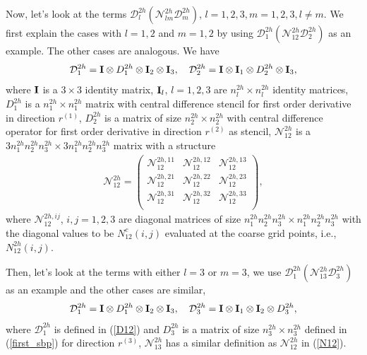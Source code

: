 Now, let's look at the terms $\mathcal{D}_l^{2h}(\mathcal{N}_{lm}^{2h}\mathcal{D}_m^{2h})$, $l = 1,2,3, m = 1,2,3, l\neq m$. We first explain the cases with $l = 1,2$ and $m = 1,2$ by using $\mathcal{D}_1^{2h}(\mathcal{N}_{12}^{2h}\mathcal{D}_2^{2h})$ as an example. The other cases are analogous. We have 
\begin{equation}\label{D12}
\mathcal{D}_1^{2h} = {\bf I}\otimes D_1^{2h} \otimes {\bf I}_2 \otimes {\bf I}_3,\ \ \ \mathcal{D}_2^{2h} ={\bf I}\otimes {\bf I}_1\otimes D_2^{2h}\otimes {\bf I}_3,
\end{equation}
where ${\bf I}$ is a $3\times3$ identity matrix, ${\bf I}_l$, $l = 1,2,3$ are $n_l^{2h}\times n_l^{2h}$ identity matrices, $D_1^{2h}$ is a $n_1^{2h}\times n_1^{2h}$ matrix with central difference stencil for first order derivative in direction $r^{(1)}$, $D_2^{2h}$ is a matrix of size $n_2^{2h}\times n_2^{2h}$ with central difference operator for first order derivative in direction $r^{(2)}$ as stencil, $\mathcal{N}_{12}^{2h}$ is a $3n_1^{2h}n_2^{2h}n_3^{2h}\times3n_1^{2h}n_2^{2h}n_3^{2h}$ matrix with a structure
\begin{align}\label{N12}
\mathcal{N}_{12}^{2h}= \left(\begin{array}{ccc}
\mathscr{N}_{12}^{2h,11}&\mathscr{N}_{12}^{2h,12}& \mathscr{N}_{12}^{2h,13}\\
\mathscr{N}_{12}^{2h,21} & \mathscr{N}_{12}^{2h,22} & \mathscr{N}_{12}^{2h,23} \\
\mathscr{N}_{12}^{2h,31}&\mathscr{N}_{12}^{2h,32}&  \mathscr{N}_{12}^{2h,33}\\ \end{array}\right),
\end{align}
where $\mathscr{N}_{12}^{2h,ij}$, $i,j = 1,2,3$ are diagonal matrices of size $n_1^{2h}n_2^{2h}n_3^{2h}\times n_1^{2h}n_2^{2h}n_3^{2h}$ with the diagonal values to be $N_{12}^{c}(i,j)$ evaluated at the coarse grid points, i.e., $N_{12}^{2h}(i,j)$. 

Then, let's look at the terms with either $l = 3$ or $m = 3$, we use $\mathcal{D}_1^{2h}(\mathcal{N}_{13}^{2h}\mathcal{D}_3^{2h})$ as an example and the other cases are similar,
\begin{equation}\label{D13}
\mathcal{D}_1^{2h} = {\bf I}\otimes D_1^{2h} \otimes {\bf I}_2 \otimes {\bf I}_3,\ \ \ \mathcal{D}_3^{2h} ={\bf I}\otimes {\bf I}_1\otimes {\bf I}_2\otimes D_3^{2h},
\end{equation}
where $\mathcal{D}_1^{2h}$ is defined in (\ref{D12}) and $D_3^{2h}$ is a matrix of size $n_3^{2h}\times n_3^{2h}$ defined in (\ref{first_sbp}) for direction $r^{(3)}$, $\mathcal{N}_{13}^{2h}$ has a similar definition as $\mathcal{N}_{12}^{2h}$ in (\ref{N12}).

